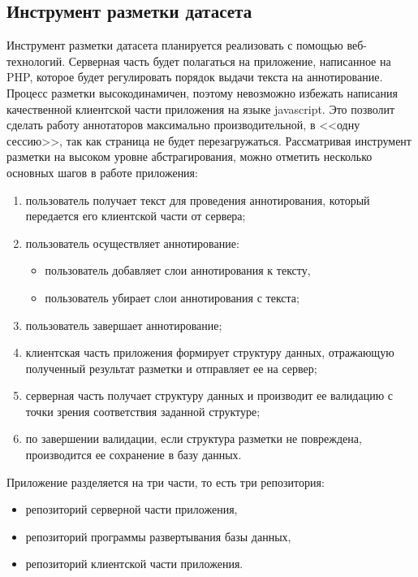 \documentclass[../main]{subfiles}
\begin{document}
\subsection{Инструмент разметки датасета}
Инструмент разметки датасета планируется реализовать с помощью веб-технологий. Серверная часть будет полагаться на приложение, написанное на PHP, которое будет регулировать порядок выдачи текста на аннотирование. Процесс разметки высокодинамичен, поэтому невозможно избежать написания качественной клиентской части приложения на языке javascript. Это позволит сделать работу аннотаторов максимально производительной, в <<одну сессию>>, так как страница не будет перезагружаться. Рассматривая инструмент разметки на высоком уровне абстрагирования, можно отметить несколько основных шагов в работе приложения:
\begin{enumerate}
    \item пользователь получает текст для проведения аннотирования, который передается его клиентской части от сервера;
    \item пользователь осуществляет аннотирование:
    \begin{itemize}
        \item пользователь добавляет слои аннотирования к тексту,
        \item пользователь убирает слои аннотирования с текста;
    \end{itemize}
    \item пользователь завершает аннотирование;
    \item клиентская часть приложения формирует структуру данных, отражающую полученный результат разметки и отправляет ее на сервер;
    \item серверная часть получает структуру данных и производит ее валидацию с точки зрения соответствия заданной структуре;
    \item по завершении валидации, если структура разметки не повреждена, производится ее сохранение в базу данных.
\end{enumerate}

Приложение разделяется на три части, то есть три репозитория:
\begin{itemize}
    \item репозиторий серверной части приложения,
    \item репозиторий программы развертывания базы данных,
    \item репозиторий клиентской части приложения.
\end{itemize}
\end{document}
